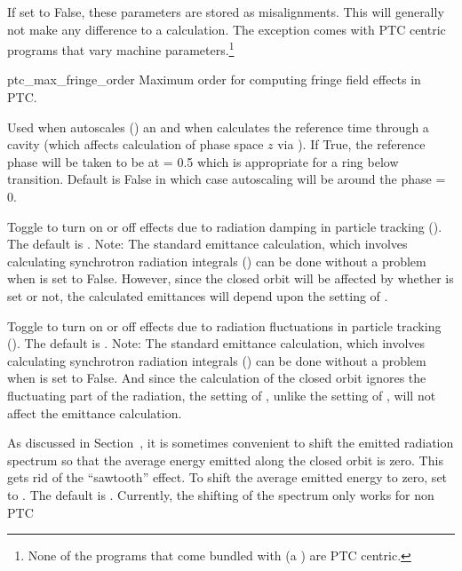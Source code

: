 {\begin{description}
If set to False, these parameters are stored as misalignments. This will generally not make any
difference to a calculation. The exception comes with PTC centric programs that vary machine
parameters.\footnote
  {
None of the programs that come bundled with \bmad (a \bmad {}) are
PTC centric.
  }
%
\item{ptc_max_fringe_order} \Newline
Maximum order for computing fringe field effects in PTC. 
%
\item[\vn{rf_phase_below_transition_ref}] \Newline
Used when \bmad autoscales () an  and when \bmad calculates the
reference time through a cavity (which affects calculation of phase space $z$ via ).  If
True, the reference phase will be taken to be at  = 0.5 which is appropriate for a ring
below transition. Default is False in which case autoscaling will be around the phase  = 0.
%
\item[\vn{radiation_damping_on}] \Newline
Toggle to turn on or off effects due to radiation damping in particle tracking
(). The default is . Note: The standard \bmad emittance calculation,
which involves calculating synchrotron radiation integrals () can be done without
a problem when  is set to False. However, since the closed orbit will be
affected by whether  is set or not, the calculated emittances will depend
upon the setting of .
%
\item[\vn{radiation_fluctuations_on}] \Newline
Toggle to turn on or off effects due to radiation fluctuations in particle tracking
().  The default is . Note: The standard \bmad emittance calculation,
which involves calculating synchrotron radiation integrals () can be done without
a problem when  is set to False. And since the calculation of the closed orbit
ignores the fluctuating part of the radiation, the setting of , unlike the
setting of , will not affect the emittance calculation.
%
\item[\vn{radiation_zero_average}] \Newline
As discussed in Section~, it is sometimes convenient to shift the emitted radiation
spectrum so that the average energy emitted along the closed orbit is zero. This gets rid of the ``sawtooth''
effect. To shift the average emitted energy to zero, set  to . The
default is . Currently, the shifting of the spectrum only works for non PTC

\end{description}}
